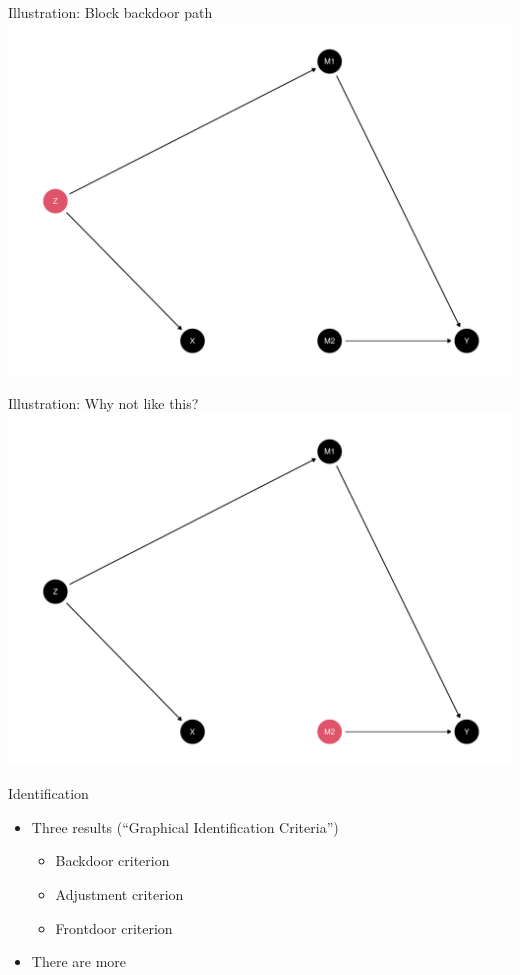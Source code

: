 \documentclass[
  11pt,
  ignorenonframetext,
]{beamer}
\providecommand{\tightlist}{%
  \setlength{\itemsep}{0pt}\setlength{\parskip}{0pt}}\usepackage{longtable,booktabs,array}
\begin{document}
\begin{frame}{Illustration: Block backdoor path}
\protect\hypertarget{illustration-block-backdoor-path}{}
\includegraphics{0_lectures_files/figure-beamer/unnamed-chunk-238-1.pdf}
\end{frame}

\begin{frame}{Illustration: Why not like this?}
\protect\hypertarget{illustration-why-not-like-this}{}
\includegraphics{0_lectures_files/figure-beamer/unnamed-chunk-239-1.pdf}
\end{frame}

\begin{frame}{Identification}
\protect\hypertarget{identification-2}{}
\begin{itemize}
\tightlist
\item
  Three results (``Graphical Identification Criteria'')

  \begin{itemize}
  \tightlist
  \item
    Backdoor criterion
  \item
    Adjustment criterion
  \item
    Frontdoor criterion
  \end{itemize}
\item
  There are more
\end{itemize}
\end{frame}
\end{document}
